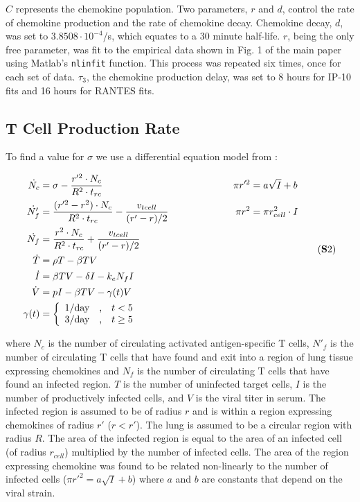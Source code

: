 \documentclass[10pt]{article}
\begin{document}
$C$ represents the chemokine population.  Two parameters, $r$ and $d$, control the rate of chemokine production and the rate of chemokine decay.  Chemokine decay, $d$, was set to $3.8508\cdot10^{-4}$/s, which equates to a 30 minute half-life. $r$, being the only free parameter, was fit to the empirical data shown in Fig. 1 of the main paper using Matlab's \texttt{nlinfit} function.  This process was repeated six times, once for each set of data.  $\tau_3$, the chemokine production delay, was set to 8 hours for IP-10 fits and 16 hours for RANTES fits.

\subsection{T Cell Production Rate}

To find a value for $\sigma$ we use a differential equation model from \cite{Miao20101}:

\begin{equation*}
\label{EqS2}
\begin{aligned}
\dot{N_{c}} &= \sigma - \frac{r'^{2} \cdot N_{c}}{R^{2} \cdot t_{rc}}    & \pi r'^{2} &= a \sqrt{I} + b \\
\dot{N'_{f}} &= \frac{(r'^{2} - r^{2}) \cdot N_{c}}{R^{2} \cdot t_{rc}} - \frac{v_{tcell}}{(r' - r) / 2} \hspace*{2cm}  & \pi r^{2} &= \pi r_{cell}^{2} \cdot I \\
\dot{N_{f}} &= \frac{r^{2} \cdot N_{c}}{R^{2} \cdot t_{rc}} + \frac{v_{tcell}}{(r' - r) / 2} \\
\dot{T} &= \rho T -\beta TV \\
\dot{I} &= \beta TV - \delta I - k_{e} N_{f} I \\
\dot{V} &= pI - \beta TV - \gamma (t) V \\
\gamma (t) &= \left\{ \begin{array}{rcl}
	1/\mbox{day} & \mbox{,}  & t < 5  \\
	3/\mbox{day} & \mbox{,} & t \geq 5  
	\end{array}\right. \\
\end{aligned}
\tag{\textbf{S}2}
\end{equation*}
\vspace{.05in}

where $N_{c}$ is the number of circulating activated antigen-specific T cells, $N'_{f}$ is the number of circulating T cells that have found and exit into a region of lung tissue expressing chemokines and $N_{f}$ is the number of circulating T cells that have found an infected region. $T$ is the number of uninfected target cells, $I$ is the number of productively infected cells, and $V$ is the viral titer in serum. The infected region is assumed to be of radius $r$ and is within a region expressing chemokines of radius $r'$ ($r  < r'$). The lung is assumed to be a circular region with radius $R$. The area of the infected region is equal to the area of an infected cell (of radius $r_{cell}$) multiplied by the number of infected cells. The area of the region expressing chemokine was found to be related non-linearly to the number of infected cells ($\pi r'^{2} = a \sqrt{I} + b$) where $a$ and $b$ are constants that depend on the viral strain.
\end{document}
